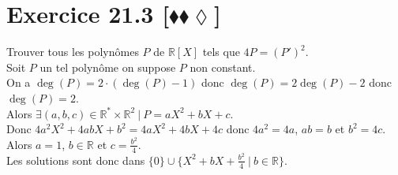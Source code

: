 \documentclass[10pt]{article}
\DeclareMathOperator{\degg}{deg}
\renewcommand{\deg}{\degg}
\begin{document}
\section*{Exercice 21.3 [$\blacklozenge\blacklozenge\lozenge$]}
\begin{tcolorbox}[enhanced, width=7.6in, center, size=fbox, fontupper=\large, drop shadow southwest]
    Trouver tous les polynômes $P$ de $\mathbb{R}[X]$ tels que $4P=(P')^2$.\\[0.2cm]
    Soit $P$ un tel polynôme on suppose $P$ non constant.\\
    On a $\deg(P)=2\cdot(\deg(P)-1)$ donc $\deg(P)=2\deg(P)-2$ donc $\deg(P)=2$.\\
    Alors $\exists (a,b,c)\in\mathbb{R}^*\times\mathbb{R}^2 ~ | ~ P = aX^2 + bX + c$.\\
    Donc $4a^2X^2 + 4abX + b^2 = 4aX^2 + 4bX + 4c$ donc $4a^2=4a$, $ab = b$ et $b^2=4c$.\\
    Alors $a=1$, $b\in\mathbb{R}$ et $c=\frac{b^2}{4}$.\\
    Les solutions sont donc dans $\{0\}\cup\{X^2+bX+\frac{b^2}{4} ~ | ~ b\in\mathbb{R}\}$.
\end{tcolorbox}
\end{document}
